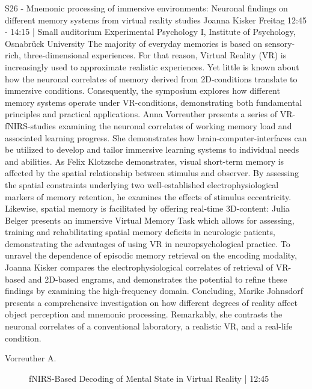 
            \begin{symposium}
            {S26 - Mnemonic processing of immersive environments: Neuronal findings on different memory systems from virtual reality studies }
            { Joanna Kisker }
            {Freitag 12:45 - 14:15 | Small auditorium}
            {Experimental Psychology I, Institute of Psychology, Osnabrück University}
            The majority of everyday memories is based on sensory-rich, three-dimensional experiences. For that reason, Virtual Reality (VR) is increasingly used to approximate realistic experiences. Yet little is known about how the neuronal correlates of memory derived from 2D-conditions translate to immersive conditions. Consequently, the symposium explores how different memory systems operate under VR-conditions, demonstrating both fundamental principles and practical applications. 
Anna Vorreuther presents a series of VR-fNIRS-studies examining the neuronal correlates of working memory load and associated learning progress. She demonstrates how brain-computer-interfaces can be utilized to develop and tailor immersive learning systems to individual needs and abilities. 
As Felix Klotzsche demonstrates, visual short-term memory is affected by the spatial relationship between stimulus and observer. By assessing the spatial constraints underlying two well-established electrophysiological markers of memory retention, he examines the effects of stimulus eccentricity. 
Likewise, spatial memory is facilitated by offering real-time 3D-content: Julia Belger presents an immersive Virtual Memory Task which allows for assessing, training and rehabilitating spatial memory deficits in neurologic patients, demonstrating the advantages of using VR in neuropsychological practice.
To unravel the dependence of episodic memory retrieval on the encoding modality, Joanna Kisker compares the electrophysiological correlates of retrieval of VR-based and 2D-based engrams, and demonstrates the potential to refine these findings by examining the high-frequency domain.
Concluding, Marike Johnsdorf presents a comprehensive investigation on how different degrees of reality affect object perception and mnemonic processing. Remarkably, she contrasts the neuronal correlates of a conventional laboratory, a realistic VR, and a real-life condition.
            \begin{description}    
            
                \item [ Vorreuther A.] fNIRS-Based Decoding of Mental State in Virtual Reality \textcolor{mygray}{ | 12:45}    
                

\end{description}
\end{symposium}
